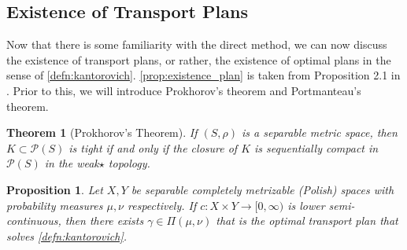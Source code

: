 \documentclass[12pt]{article}
\theoremstyle{plain}
\newtheorem{thm}{Theorem}[section]
\newtheorem{prop}{Proposition}[section]
\numberwithin{equation}{section}
\begin{document}
\subsection{Existence of Transport Plans}
Now that there is some familiarity with the direct method, we can now discuss the existence of transport plans, or rather, the existence of optimal plans in the sense of \autoref{defn:kantorovich}. \autoref{prop:existence_plan} is taken from Proposition 2.1 in \cite{villani}. Prior to this, we will introduce Prokhorov's theorem and Portmanteau's theorem.
\begin{thm}[Prokhorov's Theorem]
  If $(S,\rho)$ is a separable metric space, then $K\subset \mathcal{P}(S)$ is tight if and only if the closure of $K$ is sequentially compact in $\mathcal{P}(S)$ in the weak$\star$ topology.
\end{thm}
\begin{prop}\label{prop:existence_plan}
  Let $X,Y$ be separable completely metrizable (Polish) spaces with probability measures $\mu,\nu$ respectively. If $c : X\times Y \to [0,\infty)$ is lower semi-continuous, then there exists $\gamma\in \Pi(\mu,\nu)$
  that is the optimal transport plan that solves \autoref{defn:kantorovich}. 
\end{prop}
\end{document}
